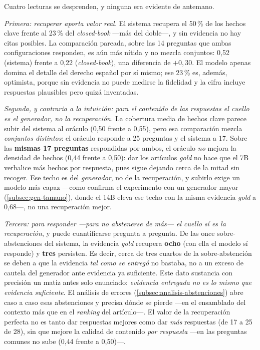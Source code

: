 Cuatro lecturas se desprenden, y ninguna era evidente de antemano.

\emph{Primera: recuperar aporta valor real.} El sistema recupera el 50\,\% de los hechos clave frente al 23\,\% del \emph{closed-book} —más del doble—, y sin evidencia no hay citas posibles. La comparación pareada, sobre las 14 preguntas que ambas configuraciones responden, es aún más nítida y no mezcla conjuntos: 0,52 (sistema) frente a 0,22 (\emph{closed-book}), una diferencia de $+0{,}30$. El modelo apenas domina el detalle del derecho español por sí mismo; ese 23\,\% es, además, optimista, porque sin evidencia no puede medirse la fidelidad y la cifra incluye respuestas plausibles pero quizá inventadas.

\emph{Segunda, y contraria a la intuición: para el contenido de las respuestas el cuello es el generador, no la recuperación.} La cobertura media de hechos clave parece subir del sistema al oráculo (0,50 frente a 0,55), pero esa comparación mezcla \emph{conjuntos distintos}: el oráculo responde a 25 preguntas y el sistema a 17. Sobre las \textbf{mismas 17 preguntas} respondidas por ambos, el oráculo \emph{no} mejora la densidad de hechos (0,44 frente a 0,50): dar los artículos \emph{gold} no hace que el 7B verbalice más hechos por respuesta, pues sigue dejando cerca de la mitad sin recoger. Ese techo es del \emph{generador}, no de la recuperación, y subirlo exige un modelo más capaz —como confirma el experimento con un generador mayor (\ref{subsec:gen-tamano}), donde el 14B eleva ese techo con la misma evidencia \emph{gold} a 0,68—, no una recuperación mejor.

\emph{Tercera: para responder —para no abstenerse de más— el cuello sí es la recuperación}, y puede cuantificarse pregunta a pregunta. De las once sobre-abstenciones del sistema, la evidencia \emph{gold} recupera \textbf{ocho} (con ella el modelo sí responde) y \textbf{tres} persisten. Es decir, cerca de tres cuartos de la sobre-abstención se deben a que la evidencia \emph{tal como se entregó} no bastaba, no a un exceso de cautela del generador ante evidencia ya suficiente. Este dato sustancia con precisión un matiz antes solo enunciado: \emph{evidencia entregada no es lo mismo que evidencia suficiente}. El análisis de errores (\ref{subsec:analisis-abstenciones}) abre caso a caso esas abstenciones y precisa dónde se pierde —en el ensamblado del contexto más que en el \emph{ranking} del artículo—. El valor de la recuperación perfecta no es tanto dar respuestas mejores como dar \emph{más} respuestas (de 17 a 25 de 28), sin que mejore la calidad de contenido \emph{por respuesta} —en las preguntas comunes no sube (0,44 frente a 0,50)—.

